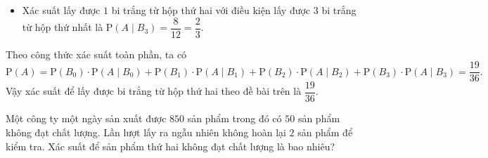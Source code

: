 \begin{bt}
{\begin{itemize}
			$\mathrm{P}\left(A\mid B_2  \right)=\dfrac{7}{12}$.
			\item Xác suất lấy được $1$ bi trắng từ hộp thứ hai  với điều kiện lấy được $3$ bi trắng từ hộp thứ nhất là
			 $\mathrm{P}\left(A\mid B_3 \right)=\dfrac{8}{12}=\dfrac{2}{3}$.
		\end{itemize}
		Theo công thức xác suất toàn phần, ta có 
		\[\mathrm{P}\left(A\right)=\mathrm{P}\left(B_0 \right)\cdot\mathrm{P}\left(A\mid B_0 \right)+\mathrm{P}\left(B_1 \right)\cdot\mathrm{P}\left(A\mid B_1 \right)+\mathrm{P}\left(B_2  \right)\cdot\mathrm{P}\left(A\mid B_2 \right)+\mathrm{P}\left(B_3 \right)\cdot\mathrm{P}\left(A\mid B_3 \right)=\dfrac{19}{36}.
		 \]
		Vậy xác suất để  lấy được bi trắng từ hộp thứ hai theo đề bài trên là $\dfrac{19}{36}$.
	 }
\end{bt}

\begin{bt}%
	Một công ty  một ngày sản xuất được $850$ sản phẩm trong đó có $50$ sản phẩm không đạt chất lượng. Lần lượt lấy ra ngẫu nhiên không hoàn lại $2$ sản phẩm để kiểm tra. Xác suất để sản phẩm thứ hai không đạt chất lượng là bao nhiêu?
\end{bt}

